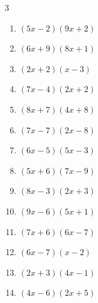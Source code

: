 \begin{multicols}{3}
\begin{enumerate}

  \item $(5x-2)(9x+2)$


  \item $(6x+9)(8x+1)$


  \item $(2x+2)(x-3)$


  \item $(7x-4)(2x+2)$


\columnbreak %

  \item $(8x+7)(4x+8)$


  \item $(7x-7)(2x-8)$


  \item $(6x-5)(5x-3)$


  \item $(5x+6)(7x-9)$


  \item $(8x-3)(2x+3)$


  \item $(9x-6)(5x+1)$


  \item $(7x+6)(6x-7)$


  \item $(6x-7)(x-2)$


  \item $(2x+3)(4x-1)$


  \item $(4x-6)(2x+5)$



\end{enumerate}
\end{multicols}
